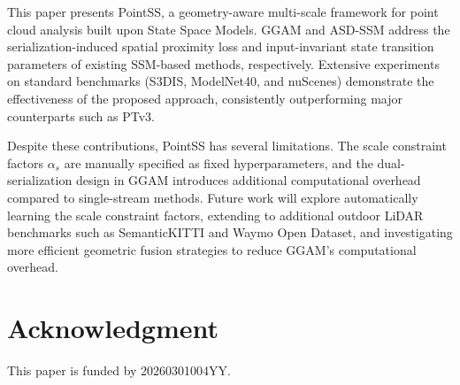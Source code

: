 \documentclass[a4paper,fleqn]{cas-sc}
\begin{document}
This paper presents PointSS, a geometry-aware multi-scale framework for point cloud analysis built upon State Space Models. GGAM and ASD-SSM address the serialization-induced spatial proximity loss and input-invariant state transition parameters of existing SSM-based methods, respectively. Extensive experiments on standard benchmarks (S3DIS, ModelNet40, and nuScenes) demonstrate the effectiveness of the proposed approach, consistently outperforming major counterparts such as PTv3.

Despite these contributions, PointSS has several limitations. The scale constraint factors $\alpha_s$ are manually specified as fixed hyperparameters, and the dual-serialization design in GGAM introduces additional computational overhead compared to single-stream methods. Future work will explore automatically learning the scale constraint factors, extending to additional outdoor LiDAR benchmarks such as SemanticKITTI and Waymo Open Dataset, and investigating more efficient geometric fusion strategies to reduce GGAM's computational overhead.

\section*{Acknowledgment}                                                                                                                                                               
This paper is funded by 20260301004YY.



\end{document}
